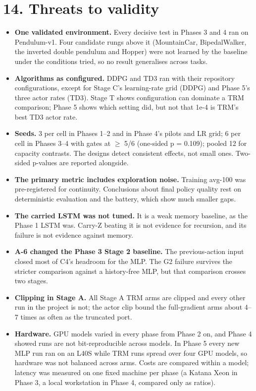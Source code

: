 \documentclass[11pt]{article}
\begin{document}
\medskip



\section*{14. Threats to validity}



\begin{itemize}
\item \textbf{One validated environment.} Every decisive test in Phases 3 and 4 ran on Pendulum-v1. Four candidate rungs above it (MountainCar, BipedalWalker, the inverted double pendulum and Hopper) were not learned by the baseline under the conditions tried, so no result generalises across tasks.
\item \textbf{Algorithms as configured.} DDPG and TD3 ran with their repository configurations, except for Stage C's learning-rate grid (DDPG) and Phase 5's three actor rates (TD3). Stage T shows configuration can dominate a TRM comparison; Phase 5 shows which setting did, but not that 1e-4 is TRM's best TD3 actor rate.
\item \textbf{Seeds.} 3 per cell in Phases 1--2 and in Phase 4's pilots and LR grid; 6 per cell in Phases 3--4 with gates at $\geq$ 5/6 (one-sided p = 0.109); pooled 12 for capacity contrasts. The designs detect consistent effects, not small ones. Two-sided p-values are reported alongside.
\item \textbf{The primary metric includes exploration noise.} Training avg-100 was pre-registered for continuity. Conclusions about final policy quality rest on deterministic evaluation and the battery, which show much smaller gaps.
\item \textbf{The carried LSTM was not tuned.} It is a weak memory baseline, as the Phase 1 LSTM was. Carry-Z beating it is not evidence for recursion, and its failure is not evidence against memory.
\item \textbf{A-6 changed the Phase 3 Stage 2 baseline.} The previous-action input closed most of C4's headroom for the MLP. The G2 failure survives the stricter comparison against a history-free MLP, but that comparison crosses two stages.
\item \textbf{Clipping in Stage A.} All Stage A TRM arms are clipped and every other run in the project is not; the actor clip bound the full-gradient arms about 4--7 times as often as the truncated port.
\item \textbf{Hardware.} GPU models varied in every phase from Phase 2 on, and Phase 4 showed runs are not bit-reproducible across models. In Phase 5 every new MLP run ran on an L40S while TRM runs spread over four GPU models, so hardware was not balanced across arms. Costs are compared within a model; latency was measured on one fixed machine per phase (a Katana Xeon in Phase 3, a local workstation in Phase 4, compared only as ratios).

\end{itemize}
\end{document}
